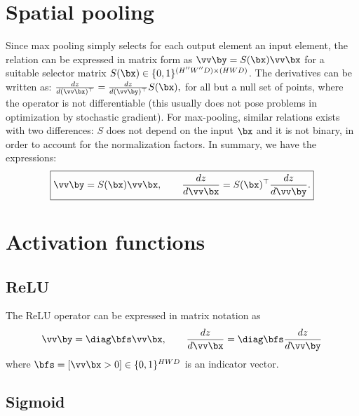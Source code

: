 \section{Spatial pooling}\label{s:impl-pooling}

Since max pooling simply selects for each output element an input element, the relation can be expressed in matrix form as
$
    \vv\by = S(\bx) \vv \bx
$
for a suitable selector matrix $S(\bx)\in\{0,1\}^{(H''W''D) \times (HWD)}$. The derivatives can be written as:
$
\frac{d z}{d (\vv \bx)^\top}
=
\frac{d z}{d (\vv \by)^\top}
S(\bx),
$
for all but a null set of points, where the operator is not differentiable (this usually does not pose problems in optimization by stochastic gradient). For max-pooling, similar relations exists with two differences: $S$ does not depend on the input $\bx$ and it is not binary, in order to account for the normalization factors. In summary, we have the expressions:
\begin{equation}\label{e:max-mat}
\boxed{
\vv\by = S(\bx) \vv \bx,
\qquad
\frac{d z}{d \vv \bx}
=
S(\bx)^\top
\frac{d z}{d \vv \by}.
}
\end{equation}



\section{Activation functions}\label{s:impl-activation}

\subsection{ReLU}\label{s:impl-relu}

The ReLU operator can be expressed in matrix notation as
\[
\vv\by = \diag\bfs \vv \bx,
\qquad
\frac{d z}{d \vv \bx}
=
\diag\bfs
\frac{d z}{d \vv \by}
\]
where $\bfs = [\vv \bx > 0] \in\{0,1\}^{HWD}$ is an indicator vector.

\subsection{Sigmoid}\label{s:impl-sigmoid}


